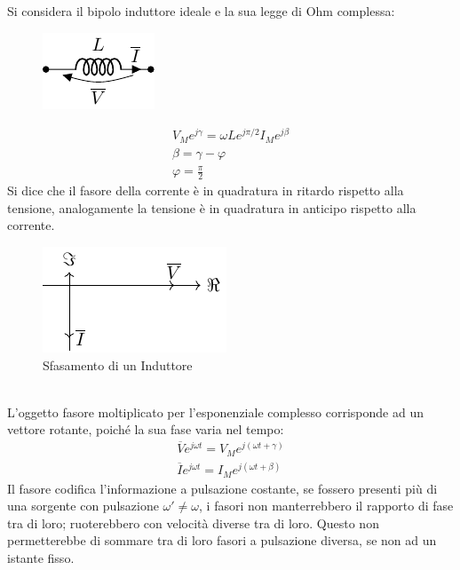 \documentclass{article}
\numberwithin{equation}{subsection}
\begin{document}
Si considera il bipolo induttore ideale e la sua legge di Ohm complessa:
\begin{figure}[H]%
    \centering
    \includegraphics{induttore-fasori.pdf}
    \label{fig:induttore-fasori}
\end{figure}

\begin{gather*}
    V_Me^{j\gamma}=\omega Le^{j\pi/2}I_Me^{j\beta}\\
    \beta=\gamma-\varphi\\
    \varphi=\displaystyle\frac{\pi}{2}
\end{gather*}
Si dice che il fasore della corrente è in quadratura in ritardo rispetto alla tensione, analogamente la tensione è in quadratura in anticipo rispetto alla corrente.
\begin{figure}[ht]%
    \centering
    \includegraphics{sfasamento-induttore.pdf}
    \caption{Sfasamento di un Induttore}
    \label{fig:sfasamento-induttore}
\end{figure}
\\
L'oggetto fasore moltiplicato per l'esponenziale complesso corrisponde ad un vettore rotante, poiché la sua fase varia nel tempo:
\begin{gather*}
    \overline{V}e^{j\omega t}=V_Me^{j(\omega t+\gamma)}\\
    \overline Ie^{j\omega t}=I_Me^{j(\omega t+\beta)}
\end{gather*}
Il fasore codifica l'informazione a pulsazione costante, se fossero presenti più di una sorgente con pulsazione $\omega'\neq\omega$, i fasori non manterrebbero il rapporto di 
fase tra di loro; ruoterebbero con velocità diverse tra di loro. Questo non permetterebbe di sommare tra di loro fasori a pulsazione diversa, se non ad un istante fisso. 
\end{document}
